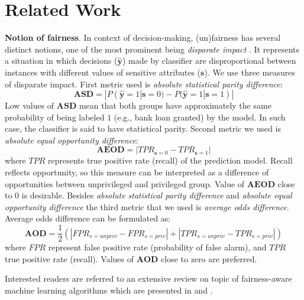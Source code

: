 \documentclass[preprint,12pt]{elsarticle}
\begin{document}
\section{Related Work}
\label{Sec:Related Work}

\textbf{Notion of fairness}. In context of decision-making, (un)fairness has several distinct notions, one of the most prominent being {\em disparate impact} \cite{barocas2016big}. It represents a situation in which decisions ($\hat{\mathbf{y}}$) made by classifier are disproportional between instances with different values of sensitive attributes ($\mathbf{s}$). We use three measures of disparate impact. First metric used is \textit{absolute statistical parity difference}:
\begin{equation}
\mathbf{ASD} = |P(\hat{\mathbf{y}}=1|\mathbf{s}=0) - P(\hat{\mathbf{y}}=1|\mathbf{s}=1)|
\label{metric:asd}
\end{equation}
Low values of $\mathbf{ASD}$ mean that both groups have approximately the same probability of being labeled $1$ (e.g., bank loan granted) by the model. In such case, the classifier is said to have statistical parity.
Second metric we used is \textit{absolute equal opportunity difference}:
\begin{equation}
\mathbf{AEOD} = |TPR_{\mathbf{s}=0} - TPR_{\mathbf{s}=1}|
\label{metric:aeod}
\end{equation}
where $TPR$ represents true positive rate (recall) of the prediction model. Recall reflects opportunity, so this measure can be interpreted as a difference of opportunities between unprivileged and privileged group. Value of $\mathbf{AEOD}$ close to 0 is desirable.
Besides \textit{absolute statistical parity difference} and \textit{absolute equal opportunity difference} the third metric that we used is \textit{average odds difference}. Average odds difference can be formulated as:
\begin{equation}
\mathbf{AOD} = \frac{1}{2}(|FPR_{s=unpriv} - FPR_{s=priv}| + |TPR_{s=unpriv} - TPR_{s=priv}|)
\label{metric:aod}
\end{equation}
where $FPR$ represent false positive rate (probability of false alarm), and $TPR$ true positive rate (recall). Values of $\mathbf{AOD}$ close to zero are preferred.

Interested readers are referred to an extensive review on topic of fairness-aware machine learning algorithms which are presented in \cite{friedler2019comparative} and \cite{corbett2018measure}.
\end{document}
